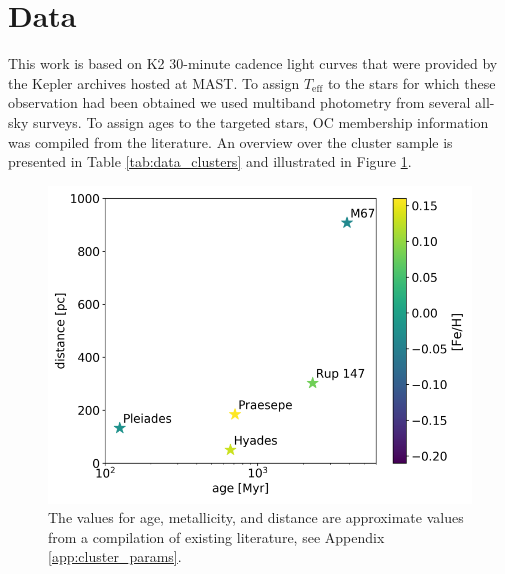 \documentclass{aa}
\begin{document}
\section{Data}
\label{sec:data}
This work is based on K2 30-minute cadence light curves that were provided by the Kepler archives hosted at MAST. To assign $T_\mathrm{eff}$ to the stars for which these observation had been obtained we used multiband photometry from several all-sky surveys. To assign ages to the targeted stars, OC membership information was compiled from the literature. An overview over the cluster sample is presented in Table \ref{tab:data_clusters} and illustrated in Figure \ref{fig:OCs}.

     \begin{figure}
            \includegraphics[width=\hsize]{pics/clusters/openclusters_logage_vs_distance.png}
         \caption{The values for age, metallicity, and distance are approximate values from a compilation of existing literature, see Appendix \ref{app:cluster_params}.}
         \label{fig:OCs}
   \end{figure}
\end{document}
